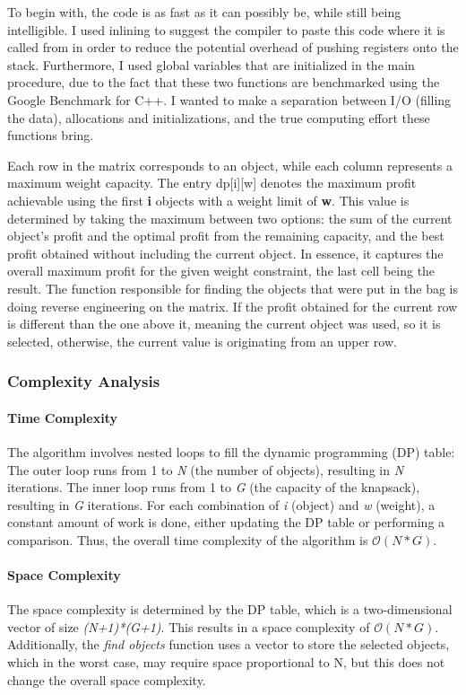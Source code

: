 \documentclass{llncs}
\begin{document}
To begin with, the code is as fast as it can possibly be, while still being intelligible. I used inlining
to suggest the compiler to paste this code where it is called from in order to reduce the potential overhead
of pushing registers onto the stack. Furthermore, I used global variables that are initialized in the main
procedure, due to the fact that these two functions are benchmarked using the Google Benchmark for C++. I
wanted to make a separation between I/O (filling the data), allocations and initializations, and the true
computing effort these functions bring.

Each row in the matrix corresponds to an object, while each column represents a maximum weight capacity.
The entry dp[i][w] denotes the maximum profit achievable using the first \textbf{i} objects with a weight
limit of \textbf{w}. This value is determined by taking the maximum between two options: the sum of the
current object's profit and the optimal profit from the remaining capacity, and the best profit obtained
without including the current object. In essence, it captures the overall maximum profit for the given weight
constraint, the last cell being the result. The function responsible for finding the objects that were put
in the bag is doing reverse engineering on the matrix. If the profit obtained for the current row is different
than the one above it, meaning the current object was used, so it is selected, otherwise, the current value
is originating from an upper row.


\subsubsection{Complexity Analysis}
\paragraph{Time Complexity}
The algorithm involves nested loops to fill the dynamic programming (DP) table:
The outer loop runs from 1 to \textit{N} (the number of objects), resulting in \textit{N} iterations.
The inner loop runs from 1 to \textit{G} (the capacity of the knapsack), resulting in \textit{G} 
iterations. For each combination of \textit{i} (object) and \textit{w} (weight), a constant amount
of work is done, either updating the DP table or performing a comparison. Thus, the overall time
complexity of the algorithm is $\mathcal{O}(N*G)$.

\paragraph{Space Complexity}
The space complexity is determined by the DP table, which is a two-dimensional vector of size 
\textit{(N+1)*(G+1)}. This results in a space complexity of $\mathcal{O}(N*G)$.
Additionally, the \textit{find objects} function uses a vector to store the selected objects, which 
in the worst case, may require space proportional to N, but this does not change the overall space 
complexity.
\end{document}
